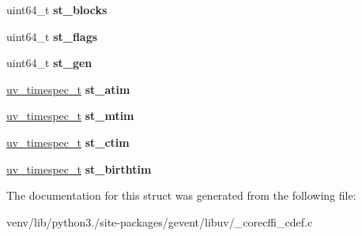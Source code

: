 \begin{DoxyCompactItemize}
uint64\+\_\+t {\bfseries st\+\_\+blocks}
\item 
\mbox{\label{structuv__stat__t_a14bc9565a316b65e422dde506d4c6428}} 
uint64\+\_\+t {\bfseries st\+\_\+flags}
\item 
\mbox{\label{structuv__stat__t_ab5036343ef8adaabecc2362f5905b9cb}} 
uint64\+\_\+t {\bfseries st\+\_\+gen}
\item 
\mbox{\label{structuv__stat__t_a90374cf48291ecde29394d1982b9eec8}} 
\hyperlink{structuv__timespec__t}{uv\+\_\+timespec\+\_\+t} {\bfseries st\+\_\+atim}
\item 
\mbox{\label{structuv__stat__t_a89f339b980cacb16da47d7a7c04f7e8a}} 
\hyperlink{structuv__timespec__t}{uv\+\_\+timespec\+\_\+t} {\bfseries st\+\_\+mtim}
\item 
\mbox{\label{structuv__stat__t_a7785fcfd6909d22b07f8461219ca2133}} 
\hyperlink{structuv__timespec__t}{uv\+\_\+timespec\+\_\+t} {\bfseries st\+\_\+ctim}
\item 
\mbox{\label{structuv__stat__t_a324b6bb9a3dcb70259e0195379c5f9ef}} 
\hyperlink{structuv__timespec__t}{uv\+\_\+timespec\+\_\+t} {\bfseries st\+\_\+birthtim}
\end{DoxyCompactItemize}


The documentation for this struct was generated from the following file\+:\begin{DoxyCompactItemize}
\item 
venv/lib/python3./site-\/packages/gevent/libuv/\+\_\+corecffi\+\_\+cdef.\+c\end{DoxyCompactItemize}
